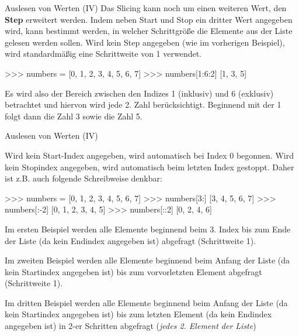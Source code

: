         \begin{frame}[fragile]{Auslesen von Werten (IV)}
            Das Slicing kann noch um einen weiteren Wert, den \textbf{Step} erweitert werden. Indem neben Start und Stop ein dritter Wert angegeben wird, kann bestimmt werden, in welcher Schrittgröße die Elemente aus der Liste gelesen werden sollen. Wird kein Step angegeben (wie im vorherigen Beispiel), wird standardmäßig eine Schrittweite von 1 verwendet.
            
\begin{pyconcode}
>>> numbers = [0, 1, 2, 3, 4, 5, 6, 7]
>>> numbers[1:6:2]
[1, 3, 5]
\end{pyconcode}
        
        Es wird also der Bereich zwischen den Indizes 1 (inklusiv) und 6 (exklusiv) betrachtet und hiervon wird jede 2. Zahl berücksichtigt. Beginnend mit der 1 folgt dann die Zahl 3 sowie die Zahl 5. 
        
        \end{frame}
        
        \begin{frame}[fragile]{Auslesen von Werten (IV)}
            
            Wird kein Start-Index angegeben, wird automatisch bei Index 0 begonnen. Wird kein Stopindex angegeben, wird automatisch beim letzten Index gestoppt. Daher ist z.B. auch folgende Schreibweise denkbar:

 \begin{pyconcode}
>>> numbers = [0, 1, 2, 3, 4, 5, 6, 7]
>>> numbers[3:]
[3, 4, 5, 6, 7]
>>> numbers[:-2]
[0, 1, 2, 3, 4, 5]
>>> numbers[::2]
[0, 2, 4, 6]
\end{pyconcode}   
           Im ersten Beispiel werden alle Elemente beginnend beim 3. Index bis zum Ende der Liste (da kein Endindex angegeben ist) abgefragt (Schrittweite 1).
           
           Im zweiten Beispiel werden alle Elemente beginnend beim Anfang der Liste (da kein Startindex angegeben ist) bis zum vorvorletzten Element abgefragt (Schrittweite 1).
           
           Im dritten Beispiel werden alle Elemente beginnend beim Anfang der Liste (da kein Startindex angegeben ist) bis zum letzten Element (da kein Endindex angegeben ist) in 2-er Schritten abgefragt (\textit{jedes 2. Element der Liste})
          
        \end{frame}
        
